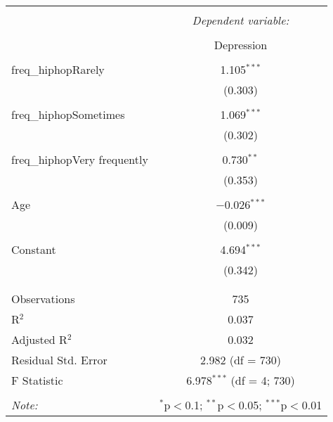 \documentclass{article}
\begin{document}
\begin{table}[!htbp] \centering 
  \caption{} 
  \label{} 
\begin{tabular}{@{\extracolsep{5pt}}lc} 
\\[-1.8ex]\hline 
\hline \\[-1.8ex] 
 & \multicolumn{1}{c}{\textit{Dependent variable:}} \\ 
\cline{2-2} 
\\[-1.8ex] & Depression \\ 
\hline \\[-1.8ex] 
 freq\_hiphopRarely & 1.105$^{***}$ \\ 
  & (0.303) \\ 
  & \\ 
 freq\_hiphopSometimes & 1.069$^{***}$ \\ 
  & (0.302) \\ 
  & \\ 
 freq\_hiphopVery frequently & 0.730$^{**}$ \\ 
  & (0.353) \\ 
  & \\ 
 Age & $-$0.026$^{***}$ \\ 
  & (0.009) \\ 
  & \\ 
 Constant & 4.694$^{***}$ \\ 
  & (0.342) \\ 
  & \\ 
\hline \\[-1.8ex] 
Observations & 735 \\ 
R$^{2}$ & 0.037 \\ 
Adjusted R$^{2}$ & 0.032 \\ 
Residual Std. Error & 2.982 (df = 730) \\ 
F Statistic & 6.978$^{***}$ (df = 4; 730) \\ 
\hline 
\hline \\[-1.8ex] 
\textit{Note:}  & \multicolumn{1}{r}{$^{*}$p$<$0.1; $^{**}$p$<$0.05; $^{***}$p$<$0.01} \\ 
\end{tabular} 
\end{table}
\end{document}
